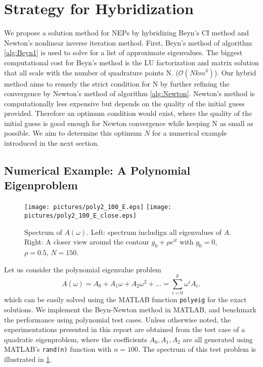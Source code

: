 \documentclass[final,leqno,onefignum,onetabnum]{siamltex1213}
\begin{document}
\section{Strategy for Hybridization}
We propose a solution method for NEPs by hybridizing Beyn's CI method and Newton's nonlinear inverse iteration method. First, Beyn's method of algorithm \ref{alg:Beyn1} is used to solve for a list of approximate eigenvalues. The biggest computational cost for Beyn's method is the LU factorization and matrix solution that all scale with the number of quadrature points N. ($\mathcal{O}(Nkm^3)$). Our hybrid method aims to remedy the strict condition for N by further refining the convergence by Newton's method of algorithm \ref{alg:Newton}. Newton's method is computationally less expensive but depends on the quality of the initial guess provided. Therefore an optimum condition would exist, where the quality of the initial guess is good enough for Newton convergence while keeping N as small as possible. We aim to determine this optimum $N$ for a numerical example introduced in the next section. 
\subsection{Numerical Example: A Polynomial Eigenproblem}
\begin{figure}
\label{fig:E}
\begin{center}
\texttt{[image: pictures/poly2\_100\_E.eps]}
\texttt{[image: pictures/poly2\_100\_E\_close.eps]}
\end{center}
\caption{Spectrum of $A(\omega)$. \textnormal{Left: spectrum includign all eigenvalues of $A$. Right: A closer view around the contour $g_0+\rho e^{it}$ with $g_0=0$, $\rho=0.5$, $N=150$.}}
\end{figure}

Let us consider the polynomial eigenvalue problem 
\begin{equation}
\label{eq:polyeig}
A(\omega)= A_0+A_1 \omega + A_2 \omega^2 + \ldots =\sum\limits_{i=0}^{p}\omega^iA_i ,
\end{equation}
which can be easily solved using the MATLAB function {\tt polyeig} for the exact solutions. We implement the Beyn-Newton method in MATLAB, and benchmark the performance using polynomial test cases. Unless otherwise noted, the experimentations presented in this report are obtained from the test case of a quadratic eigenproblem, where the coefficients $A_0, A_1, A_2$ are all generated using MATLAB's {\tt rand(n)} function with $n=100$. The spectrum of this test problem is illustrated in \ref{fig:E}.  
\end{document}
